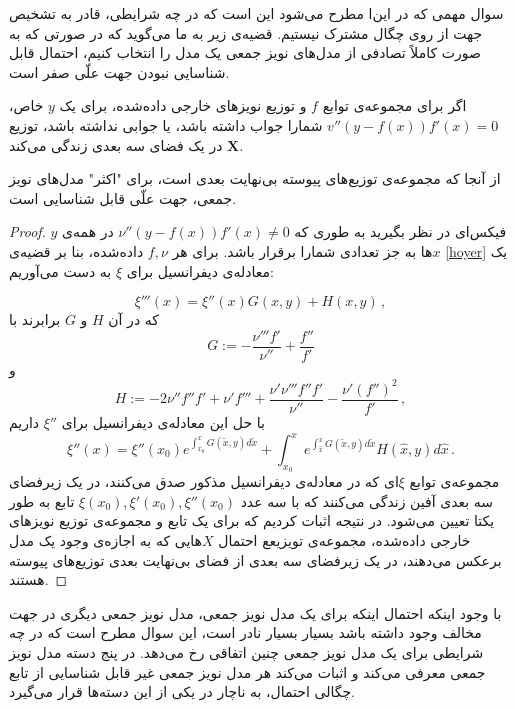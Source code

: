 \documentclass{article}
\begin{document}
سوال مهمی که در این‌ا مطرح می‌شود این است که در چه شرایطی، قادر به تشخیص جهت از روی چگال مشترک نیستیم. قضیه‌ی زیر به ما می‌گوید که در صورتی که به صورت کاملاً تصادفی از مدل‌های نویز جمعی یک مدل را انتخاب کنیم، احتمال قابل شناسایی نبودن جهت علّی صفر است.

\begin{thm}
اگر برای مجموعه‌ی توابع $f$ و توزیع نویز‌های خارجی داده‌شده، برای یک $y$ خاص،
$v''(y-f(x))f'(x)=0$
شمارا جواب داشته باشد، یا جوابی نداشته باشد، توزیع 
$\textbf{X}$
در یک فضای سه بعدی زندگی می‌کند.
\end{thm}
از آنجا که مجموعه‌ی توزیع‌های پیوسته بی‌نهایت بعدی است، برای "اکثر" مدل‌‌های نویز جمعی، جهت علّی قابل شناسایی است.

\begin{proof}
	$y$ 
	فیکس‌ای در نظر بگیرید به طوری که 
    $\nu''(y-f(x))f'(x)\neq 0$ 
	در همه‌ی $x$ها به جز تعدادی شمارا برقرار باشد. برای هر $f,\nu$ داده‌شده، بنا بر قضیه‌ی 
	\ref{hoyer}
	یک معادله‌ی دیفرانسیل برای $\xi$ به دست می‌آوریم:

	\begin{equation}\label{DGLmitG}
	\xi'''(x)=\xi''(x) G(x,y) +H(x,y)  \,,
	\end{equation}
که در آن $H$ و $G$ برابرند با
	$$
	G:= -\frac{\nu'''f'}{\nu''}+\frac{f''}{f'}
	$$
	و
	$$ 
	H:= -2\nu''f''f' +\nu'f'''+\frac{\nu'\nu'''f''f'}{\nu''}-\frac{\nu'(f'')^2}{f'} \,,
	$$
	با حل این معادله‌ی دیفرانسیل برای $\xi''$ داریم
	\begin{equation}\label{rInt}
	\xi''(x)=\xi''(x_0) e^{\int_{x_0}^x G(\tilde{x},y) d\tilde{x}}	
	+\int_{x_0}^x  e^{\int_{\hat{x}}^x G(\tilde{x},y)d\tilde{x}} 
	H(\hat{x},y) d\hat{x}\,.
	\end{equation}
مجموعه‌ی توابع $\xi$ای که در معادله‌ی دیفرانسیل مذکور صدق می‌کنند، در یک زیرفضای سه بعدی آفین زندگی می‌کنند که با سه عدد 
 $\xi(x_0),\xi'(x_0),\xi''(x_0)$ 
تابع به طور یکتا تعیین می‌شود. در نتیجه اثبات کردیم که برای یک تابع و مجموعه‌ی توزیع نویز‌های خارجی داده‌شده، مجموعه‌ی تویزیعع احتمال $X$هایی که به اجازه‌ی وجود یک مدل برعکس می‌دهند، در یک زیرفضای سه بعدی از فضای بی‌نهایت بعدی توزیع‌های پیوسته هستند.
\end{proof}
با وجود اینکه احتمال اینکه برای یک مدل نویز جمعی، مدل نویز جمعی دیگری در جهت مخالف وجود داشته باشد بسیار بسیار نادر است، این سوال مطرح است که در چه شرایطی برای یک مدل نویز جمعی چنین اتفاقی رخ می‌دهد.
در 
\cite{postnonlinear}
پنج دسته مدل نویز جمعی معرفی می‌کند و اثبات می‌کند هر مدل نویز جمعی غیر قابل شناسایی از تابع چگالی احتمال، به ناچار در یکی از این دسته‌ها قرار می‌گیرد.
\end{document}
